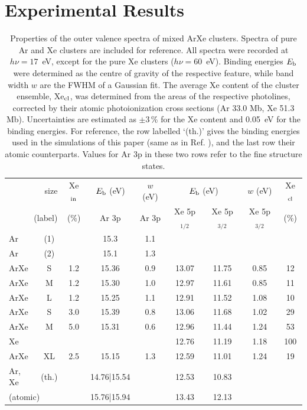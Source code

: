 \section{Experimental Results
\label{sec:exp_results}}
%
%
\begin{table}
\caption{Properties of the outer valence spectra of mixed ArXe clusters. 
Spectra of pure Ar and Xe clusters are included for reference. 
All spectra were recorded at $h\nu = 17$~eV, except for the pure Xe clusters ($h\nu = 60$~eV). 
Binding energies $E_{\rm b}$ were determined as the centre of gravity of the respective feature, while band width $w$ are the FWHM of a Gaussian fit. 
The average Xe content of the cluster ensemble, Xe$_{\rm cl}$, was determined from the areas of the respective photolines, corrected by their atomic photoionization cross sections (Ar 33.0 Mb, Xe 51.3 Mb)\cite{samson2002}.
Uncertainties are estimated as $\pm$3\,\% for the Xe content and 0.05~eV for the binding energies. 
For reference, the row labelled `(th.)' gives the binding energies used in the simulations of this paper (same as in Ref. ), and the last row their atomic counterparts. 
Values for Ar 3p in these two rows refer to the fine structure states.
\label{tab:valence} }
\begin{tabular}{ l c c c c c c c c}
%
\toprule
 \multicolumn{2}{r}{size} &  Xe$_{\rm in}$& $E_{\rm b}$ (eV)& $w$ (eV)& \multicolumn{2}{c}{$E_{\rm b}$ (eV)}  & $w$ (eV) &  Xe$_{\rm cl}$ \\
%
 \multicolumn{2}{r}{(label)}&  (\%) & Ar 3p & Ar 3p & Xe 5p$_{1/2}$ &  Xe 5p$_{3/2}$ & Xe 5p$_{3/2}$  &  (\%) \\
\midrule
 Ar & (1) &&  15.3  &  1.1 & & & &  \\
 Ar & (2) &&  15.1  &  1.3 & & & &  \\
%
 ArXe & S &1.2 & 15.36 & 0.9 & 13.07 & 11.75 & 0.85 & 12\\
 ArXe & M &1.2 & 15.30 & 1.0 & 12.97 & 11.61 & 0.85 & 11\\
 ArXe & L &1.2 & 15.25 & 1.1 & 12.91 & 11.52 & 1.08 & 10\\
 ArXe & S &3.0 & 15.39 & 0.8 & 13.06 & 11.68 & 1.02 & 29\\
 ArXe & M &5.0 & 15.31 & 0.6 & 12.96 & 11.44 & 1.24 & 53\\
 Xe &  & & & & 12.76 & 11.19 & 1.18 & 100\\
%
\midrule
%
 ArXe & XL &2.5 & 15.15 & 1.3 & 12.59 & 11.01 & 1.24 & 19\\
%
\midrule
%
 Ar, Xe & (th.) && 14.76|15.54 && 12.53 & 10.83 &&\\
%
 \multicolumn{2}{l}{(atomic)\cite{velchev,sansonetti}} && 15.76|15.94 && 13.43 & 12.13 &&\\
%
\bottomrule
\end{tabular}
\end{table}

